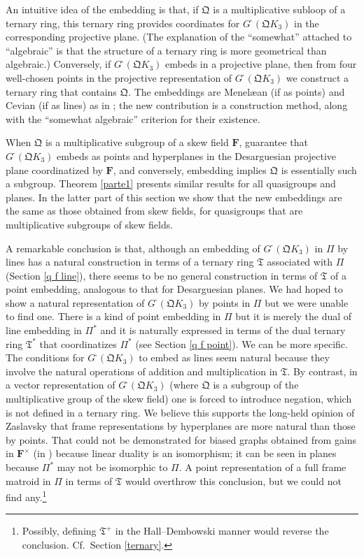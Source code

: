 \documentclass[reqno,12pt]{amsart}
\newcommand \comment[1]{}				%
\theoremstyle{remark}
\numberwithin{equation}{section}
\numberwithin{figure}{section}
\newcommand \full{^{{}^{{}_{{}_\bullet}}\!}}
\newcommand\fF{\mathbf{F}}	%
\newcommand \fQ{\mathfrak Q}
\newcommand \fT{\mathfrak T}
\newcommand\PP{\Pi}	%
\newcommand\G{{G\full}}
\newcommand\mencev{\cite[Section 2\comment{mencev}]{BG6} }		%
\begin{document}
An intuitive idea of the embedding is that, if $\fQ$ is a multiplicative subloop of a ternary ring, this ternary ring provides coordinates for $\G(\fQ K_3)$ in the corresponding projective plane.  (The explanation of the ``somewhat'' attached to ``algebraic'' is that the structure of a ternary ring is more geometrical than algebraic.)  Conversely, if $\G(\fQ K_3)$ embeds in a projective plane, then from four well-chosen points in the projective representation of $\G(\fQ K_3)$ we construct a ternary ring that contains $\fQ$.  The embeddings are Menel{\ae}an (if as points) and Cevian (if as lines) as in \mencev; the new contribution is a construction method, along with the ``somewhat algebraic'' criterion for their existence.

When $\fQ$ is a multiplicative subgroup of a skew field $\fF$, \cite[Theorem IV.2.1 and Corollary IV.2.4]{BG} guarantee that $\G(\fQ K_3)$ embeds as points and hyperplanes in the Desarguesian projective plane coordinatized by $\fF$, and conversely, embedding implies $\fQ$ is essentially such a subgroup.  Theorem \ref{parte1} presents similar results for all quasigroups and planes.  
In the latter part of this section we show that the new embeddings are the same as those obtained from skew fields, for quasigroups that are multiplicative subgroups of skew fields.


A remarkable conclusion is that, although an embedding of $\G(\fQ K_3)$ in $\PP$ by lines has a natural construction in terms of a ternary ring $\fT$ associated with $\PP$ (Section \ref{q f line}), there seems to be no general construction in terms of $\fT$ of a point embedding, analogous to that for Desarguesian planes.  
We had hoped to show a natural representation of $\G(\fQ K_3)$ by points in $\PP$ but we were unable to find one.  There is a kind of point embedding in $\PP$ but it is merely the dual of line embedding in $\PP^*$ and it is naturally expressed in terms of the dual ternary ring $\fT^*$ that coordinatizes $\PP^*$ (see Section \ref{q f point}).  
We can be more specific.  The conditions for $\G(\fQ K_3)$ to embed as lines seem natural because they involve the natural operations of addition and multiplication in $\fT$.  
By contrast, in a vector representation of $\G(\fQ K_3)$ \cite[Section IV.2]{BG} (where $\fQ$ is a subgroup of the multiplicative group of the skew field) one is forced to introduce negation, which is not defined in a ternary ring.  
We believe this supports the long-held opinion of Zaslavsky that frame representations by hyperplanes are more natural than those by points.  
That could not be demonstrated for biased graphs obtained from gains in $\fF^\times$ (in \cite[Part IV]{BG}) because linear duality is an isomorphism; it can be seen in planes because $\PP^*$ may not be isomorphic to $\PP$.  A point representation of a full frame matroid in $\PP$ in terms of $\fT$ would overthrow this conclusion, but we could not find any.\footnote{Possibly, defining $\fT^+$ in the Hall--Dembowski manner would reverse the conclusion.  Cf.\ Section \ref{ternary}.}
\end{document}
